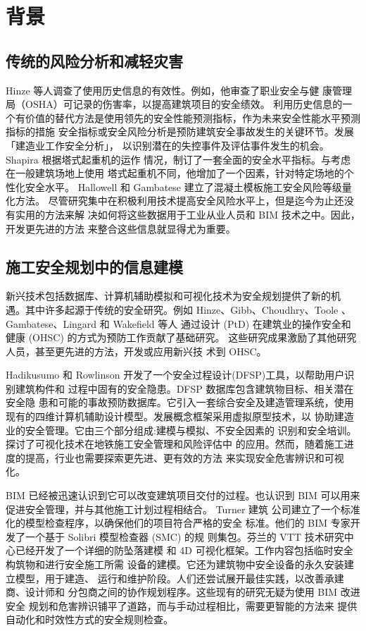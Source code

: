 \section{背景}
\subsection{传统的风险分析和减轻灾害}
Hinze 等人调查了使用历史信息的有效性。例如，他审查了职业安全与健
康管理局（OSHA）可记录的伤害率，以提高建筑项目的安全绩效。
利用历史信息的一个有价值的替代方法是使用领先的安全性能预测指标，作为未来安全性能水平预测指标的措施
安全指标或安全风险分析是预防建筑安全事故发生的关键环节。发展「建造业工作安全分析」，
以识别潜在的失控事件及评估事件发生的机会。
Shapira 根据塔式起重机的运作
情况，制订了一套全面的安全水平指标。与考虑在一般建筑场地上使用
塔式起重机不同，他增加了一个因素，针对特定场地的个性化安全水平。
Hallowell 和 Gambatese 建立了混凝土模板施工安全风险等级量化方法。
尽管研究集中在积极利用技术提高安全风险水平上，但是迄今为止还没有实用的方法来解
决如何将这些数据用于工业从业人员和 BIM 技术之中。因此，开发更先进的方法
来整合这些信息就显得尤为重要。

\subsection{施工安全规划中的信息建模}
新兴技术包括数据库、计算机辅助模拟和可视化技术为安全规划提供了新的机
遇。其中许多起源于传统的安全研究。例如
Hinze、Gibb、Choudhry、Toole 、Gambatese、Lingard 和 Wakefield 等人
通过设计 (PtD) 在建筑业的操作安全和健康 (OHSC) 的方式为预防工作贡献了基础研究。
这些研究成果激励了其他研究人员，甚至更先进的方法，开发或应用新兴技
术到 OHSC。

Hadikusumo 和 Rowlinson 开发了一个安全过程设计(DFSP)工具，以帮助用户识别建筑构件和
过程中固有的安全隐患。DFSP 数据库包含建筑物目标、相关潜在安全隐
患和可能的事故预防数据库。它引入一套综合安全及建造管理系统，使用
现有的四维计算机辅助设计模型。发展概念框架采用虚拟原型技术，以
协助建造业的安全管理。它由三个部分组成:建模与模拟、不安全因素的
识别和安全培训。探讨了可视化技术在地铁施工安全管理和风险评估中
的应用。然而，随着施工进度的提高，行业也需要探索更先进、更有效的方法
来实现安全危害辨识和可视化。

BIM 已经被迅速认识到它可以改变建筑项目交付的过程。也认识到
BIM 可以用来促进安全管理，并与其他施工计划过程相结合。 Turner 建筑
公司建立了一个标准化的模型检查程序，以确保他们的项目符合严格的安全
标准。他们的 BIM 专家开发了一个基于 Solibri 模型检查器 (SMC) 的规
则集包。芬兰的 VTT 技术研究中心已经开发了一个详细的防坠落建模
和 4D 可视化框架。工作内容包括临时安全构筑物和进行安全施工所需
设备的建模。它还为建筑物中安全设备的永久安装建立模型，用于建造、
运行和维护阶段。人们还尝试展开最佳实践，以改善承建商、设计师和
分包商之间的协作规划程序。这些现有的研究无疑为使用 BIM 改进安全
规划和危害辨识铺平了道路，而与手动过程相比，需要更智能的方法来
提供自动化和时效性方式的安全规则检查。

